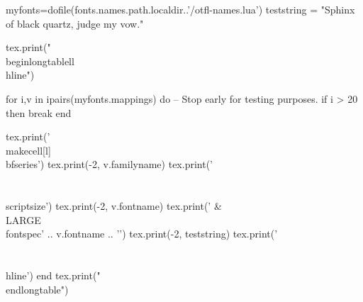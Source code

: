 \documentclass{article}
\begin{document}
\begin{luacode}
myfonts=dofile(fonts.names.path.localdir..'/otfl-names.lua')
teststring = "Sphinx of black quartz, judge my vow."

tex.print("\\begin{longtable}{ll}\\hline")

for i,v in ipairs(myfonts.mappings) do
  -- Stop early for testing purposes.
  if i > 20 then break end

  tex.print('\\makecell[l]{\\bfseries')
  tex.print(-2, v.familyname)
  tex.print('\\\\[-1ex] \\scriptsize')
  tex.print(-2, v.fontname)
  tex.print('} & \\LARGE\\fontspec{' .. v.fontname .. '}')
  tex.print(-2, teststring)
  tex.print('\\\\ \\hline')
end
tex.print("\\end{longtable}")
\end{luacode}
\end{document}
